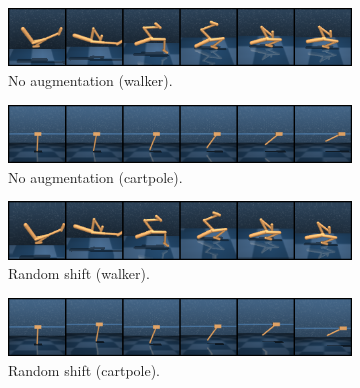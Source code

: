 \begin{figure}[H]
    \centering
    \begin{subfigure}[b]{0.48\textwidth}
        \centering
        \includegraphics[width=\textwidth]{figures/visualizations/grid_original.png}
        \caption{No augmentation (walker).}
        \vspace{0.1in}
    \end{subfigure}
    \begin{subfigure}[b]{0.48\textwidth}
        \centering
        \includegraphics[width=\textwidth]{figures/visualizations/grid_cartpole_original.png}
        \caption{No augmentation (cartpole).}
        \vspace{0.1in}
    \end{subfigure}
    \begin{subfigure}[b]{0.48\textwidth}
        \centering
        \includegraphics[width=\textwidth]{figures/visualizations/grid_shift.png}
        \caption{Random shift (walker).}
        \vspace{0.1in}
    \end{subfigure}
    \begin{subfigure}[b]{0.48\textwidth}
        \centering
        \includegraphics[width=\textwidth]{figures/visualizations/grid_cartpole_shift.png}
        \caption{Random shift (cartpole).}
        \vspace{0.1in}
    \end{subfigure}
    \begin{subfigure}[b]{0.48\textwidth}

\end{subfigure}
\end{figure}
